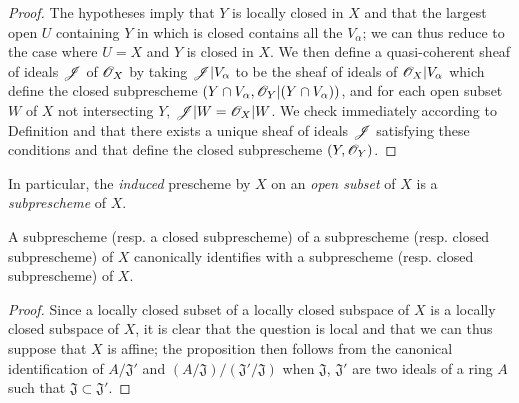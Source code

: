 \begin{proof}
\label{proof-1.4.1.5}
The hypotheses imply that $Y$ is locally closed in $X$ and that the largest open $U$
containing $Y$ in which is closed contains all the $V_\alpha$; we can thus reduce to the case
where $U=X$ and $Y$ is closed in $X$. We then define a quasi-coherent sheaf of ideals
$\mathscr{J}$ of $\mathscr{O}_X$ by taking $\mathscr{J}|V_\alpha$ to be the sheaf of ideals of $\mathscr{O}_X|V_\alpha$
which define the closed subprescheme $(Y\cap V_\alpha,\mathscr{O}_Y|(Y\cap V_\alpha))$, and for each
open subset $W$ of $X$ not intersecting $Y$, $\mathscr{J}|W=\mathscr{O}_X|W$. We check immediately
according to Definition  and 
that there exists a unique sheaf of ideals $\mathscr{J}$ satisfying these conditions and that
define the closed subprescheme $(Y,\mathscr{O}_Y)$.
\end{proof}

In particular, the {\em induced} prescheme by $X$ on an {\em open subset} of $X$ is a
{\em subprescheme} of $X$.

\begin{prop}[4.1.6]
\label{1.4.1.6}
A subprescheme (resp. a closed subprescheme) of a subprescheme
(resp. closed subprescheme) of $X$ canonically identifies with a subprescheme
(resp. closed subprescheme) of $X$.
\end{prop}

\begin{proof}
\label{proof-1.4.1.6}
Since a locally closed subset of a locally closed subspace of $X$ is a locally closed
subspace of $X$, it is clear  that the question is local
and that we can thus suppose that $X$ is affine; the proposition then follows from the
canonical identification of $A/\mathfrak{J}'$ and
$(A/\mathfrak{J})/(\mathfrak{J}'/\mathfrak{J})$ when $\mathfrak{J}$, $\mathfrak{J}'$ are
two ideals of a ring $A$ such that $\mathfrak{J}\subset\mathfrak{J}'$.
\end{proof}

